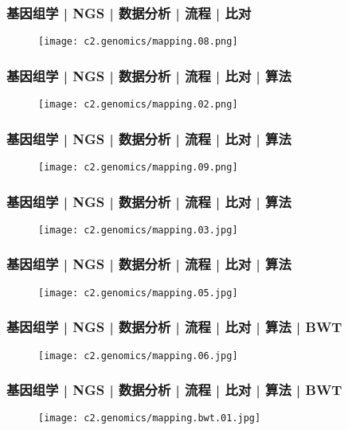 \begin{frame}
  \frametitle{基因组学 | NGS | 数据分析 | 流程 | 比对}
  \begin{figure}
    \centering
    \texttt{[image: c2.genomics/mapping.08.png]}
  \end{figure}
\end{frame}

\begin{frame}
  \frametitle{基因组学 | NGS | 数据分析 | 流程 | 比对 | 算法}
  \begin{figure}
    \centering
    \texttt{[image: c2.genomics/mapping.02.png]}
  \end{figure}
\end{frame}

\begin{frame}
  \frametitle{基因组学 | NGS | 数据分析 | 流程 | 比对 | 算法}
  \begin{figure}
    \centering
    \texttt{[image: c2.genomics/mapping.09.png]}
  \end{figure}
\end{frame}

\begin{frame}
  \frametitle{基因组学 | NGS | 数据分析 | 流程 | 比对 | 算法}
  \begin{figure}
    \centering
    \texttt{[image: c2.genomics/mapping.03.jpg]}
  \end{figure}
\end{frame}

\begin{frame}
  \frametitle{基因组学 | NGS | 数据分析 | 流程 | 比对 | 算法}
  \begin{figure}
    \centering
    \texttt{[image: c2.genomics/mapping.05.jpg]}
  \end{figure}
\end{frame}

\begin{frame}
  \frametitle{基因组学 | NGS | 数据分析 | 流程 | 比对 | 算法 | BWT}
  \begin{figure}
    \centering
    \texttt{[image: c2.genomics/mapping.06.jpg]}
  \end{figure}
\end{frame}

\begin{frame}
  \frametitle{基因组学 | NGS | 数据分析 | 流程 | 比对 | 算法 | BWT}
  \begin{figure}
    \centering
    \texttt{[image: c2.genomics/mapping.bwt.01.jpg]}
  \end{figure}
\end{frame}

